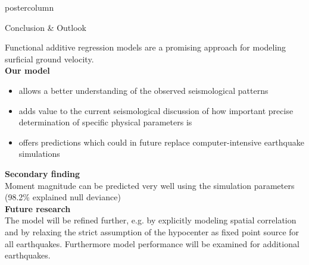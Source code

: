 \documentclass[final,hyperref={pdfpagelabels=false}]{beamer}
\newcommand{\bfBlue}[1]{\textcolor{koaladarkestblue}{\textbf{#1}}}
\newcommand*\circled[1]{\tikz[baseline=(char.base)]{
\node[shape=circle,draw,inner sep=2pt] (char) {#1};}}
\begin{document}
\begin{frame}
\begin{columns}
\begin{column}{1\textwidth}
\begin{columns}[T]
\begin{column}{.484\textwidth}
\begin{beamercolorbox}[center,wd=\textwidth]{postercolumn}
\begin{minipage}[T]{.95\textwidth}
\begin{block}{\footnotesize \circled{4} Conclusion \& Outlook}
\begin{minipage}[T]{.95\textwidth}  %
\vspace{1ex}
Functional additive regression models are a promising approach for modeling surficial ground velocity.
\\[2.4ex]
\bfBlue{Our model}
\begin{itemize}
  \item allows a better understanding of the observed seismological patterns
  \item adds value to the current seismological discussion of how important precise determination of specific physical parameters is
  \item offers predictions which could in future replace computer-intensive earthquake simulations
\end{itemize}
\vspace{2.2ex}
{\small
\bfBlue{Secondary finding} \\[0.15cm] Moment magnitude can be predicted very well using the simulation parameters (98.2\% explained null deviance)
}
\\[2.3ex]
\bfBlue{Future research} \\[0.1cm]
The model will be refined further, e.g. by explicitly modeling spatial correlation and by relaxing the strict assumption of the hypocenter as fixed point source for all earthquakes. Furthermore model performance will be examined for additional earthquakes.
\end{minipage}
\end{block}



\end{minipage}
\end{beamercolorbox}
\end{column}
\end{columns}
\end{column}
\end{columns}
\end{frame}
\end{document}
